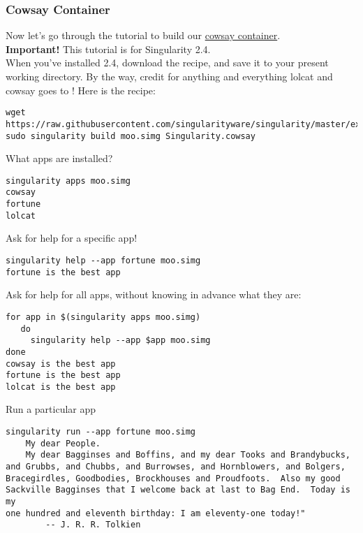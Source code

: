 \documentclass[a4paper]{article}
\begin{document}
\subsubsection{Cowsay Container}

Now let’s go through the tutorial to build our \href{https://github.com/singularityware/singularity/blob/development/examples/apps/Singularity.cowsay}{cowsay container}.\\[0.1in]

\textbf{Important!} This tutorial is for Singularity 2.4.\\[0.1in]

When you’ve installed 2.4, download the recipe, and save it to your present working directory. By the way, credit for anything and everything lolcat and cowsay goes to \href{https://www.github.com/GodLoveD}{\@GodLoveD}! Here is the recipe:

\begin{lstlisting}[frame=single]  
wget https://raw.githubusercontent.com/singularityware/singularity/master/examples/apps/Singularity.cowsay
sudo singularity build moo.simg Singularity.cowsay
\end{lstlisting}

What apps are installed?

\begin{lstlisting}[frame=single] 
singularity apps moo.simg
cowsay
fortune
lolcat 
\end{lstlisting}

Ask for help for a specific app!

\begin{lstlisting}[frame=single]
singularity help --app fortune moo.simg
fortune is the best app  
\end{lstlisting}

Ask for help for all apps, without knowing in advance what they are: \\[0.1in]

\begin{lstlisting}[frame=single]
for app in $(singularity apps moo.simg)
   do
     singularity help --app $app moo.simg
done
cowsay is the best app
fortune is the best app
lolcat is the best app  
\end{lstlisting}

Run a particular app\\[0.1in]

\begin{lstlisting}[frame=single]  
singularity run --app fortune moo.simg
	My dear People.
	My dear Bagginses and Boffins, and my dear Tooks and Brandybucks,
and Grubbs, and Chubbs, and Burrowses, and Hornblowers, and Bolgers,
Bracegirdles, Goodbodies, Brockhouses and Proudfoots.  Also my good
Sackville Bagginses that I welcome back at last to Bag End.  Today is my
one hundred and eleventh birthday: I am eleventy-one today!"
		-- J. R. R. Tolkien
\end{lstlisting}
\end{document}
